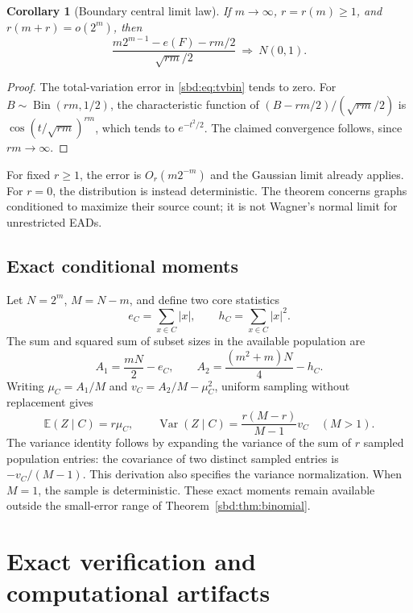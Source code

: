 \documentclass[11pt,a4paper]{article}
\newtheorem{corollary}[theorem]{Corollary}
\theoremstyle{definition}
\newcommand{\E}{\mathbb E}
\newcommand{\Var}{\operatorname{Var}}
\DeclareMathOperator{\Bin}{Bin}
\begin{document}
\begin{corollary}[Boundary central limit law]\label{sbd:cor:clt}
If $m\to\infty$, $r=r(m)\ge1$, and $r(m+r)=o(2^m)$, then
\begin{equation}\label{sbd:eq:clt}
 \frac{m2^{m-1}-e(F)-rm/2}{\sqrt{rm}/2}
 \ \Longrightarrow\ N(0,1).
\end{equation}
\end{corollary}
\begin{proof}
The total-variation error in \eqref{sbd:eq:tvbin} tends to zero.
For $B\sim\Bin(rm,1/2)$, the characteristic function of
$(B-rm/2)/(\sqrt{rm}/2)$ is
$\cos(t/\sqrt{rm})^{rm}$, which tends to $e^{-t^2/2}$.
The claimed convergence follows, since $rm\to\infty$.
\end{proof}
For fixed $r\ge1$, the error is $O_r(m2^{-m})$ and the Gaussian limit
already applies. For $r=0$, the distribution is instead deterministic.
The theorem concerns graphs conditioned to maximize their source count;
it is not Wagner's normal limit for unrestricted EADs.

\subsection{Exact conditional moments}
Let $N=2^m$, $M=N-m$, and define two core statistics
\[
 e_C=\sum_{x\in C}|x|,\qquad h_C=\sum_{x\in C}|x|^2.
\]
The sum and squared sum of subset sizes in the available population are
\[
 A_1=\frac{mN}{2}-e_C,\qquad
 A_2=\frac{(m^2+m)N}{4}-h_C.
\]
Writing $\mu_C=A_1/M$ and $v_C=A_2/M-\mu_C^2$, uniform
sampling without replacement gives
\begin{equation}\label{sbd:eq:moments}
 \E(Z\mid C)=r\mu_C,\qquad
 \Var(Z\mid C)=\frac{r(M-r)}{M-1}v_C\quad(M>1).
\end{equation}
The variance identity follows by expanding the variance of the sum of
$r$ sampled population entries: the covariance of two distinct sampled
entries is $-v_C/(M-1)$. This derivation also specifies the variance
normalization. When $M=1$, the sample is deterministic.
These exact moments remain available outside the small-error range of
Theorem~\ref{sbd:thm:binomial}.

\section{Exact verification and computational artifacts}
\end{document}
